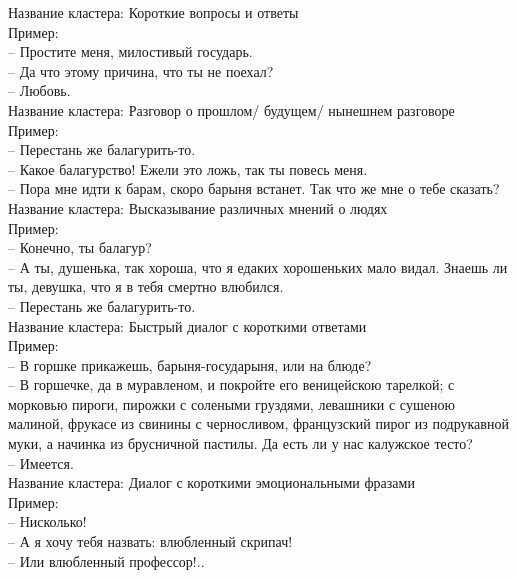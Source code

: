 \documentclass[a4paper,14pt]{article}
\begin{document}
Название кластера: Короткие вопросы и ответы\\
Пример: \\
-- Простите меня, милостивый государь. \\
-- Да что этому причина, что ты не поехал? \\
-- Любовь. \\



Название кластера: Разговор о прошлом/ будущем/ нынешнем разговоре\\
Пример: \\
-- Перестань же балагурить-то. \\
-- Какое балагурство! Ежели это ложь, так ты повесь меня. \\
-- Пора мне идти к барам, скоро барыня встанет. Так что же мне о тебе сказать? \\



Название кластера: Высказывание различных мнений о людях\\
Пример: \\
-- Конечно, ты балагур? \\
-- А ты, душенька, так хороша, что я едаких хорошеньких мало видал. Знаешь ли ты,
              девушка, что я в тебя смертно влюбился. \\
-- Перестань же балагурить-то. \\



Название кластера: Быстрый диалог с короткими ответами\\
Пример: \\
-- В горшке прикажешь, барыня-государыня, или на блюде? \\
-- В горшечке, да в муравленом, и покройте его веницейскою тарелкой; с морковью пироги,
              пирожки с солеными груздями, левашники с сушеною малиной, фрукасе из свинины с
              черносливом, французский пирог из подрукавной муки, а начинка из брусничной пастилы.
              Да есть ли у нас калужское тесто? \\
-- Имеется. \\



Название кластера: Диалог с короткими эмоциональными фразами\\
Пример: \\
-- Нисколько! \\
-- А я хочу тебя назвать: влюбленный скрипач! \\
-- Или влюбленный профессор!.. \\
\end{document}
